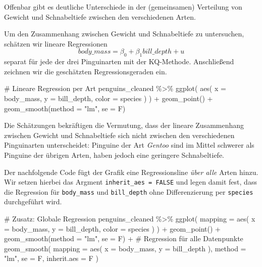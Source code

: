 \documentclass[
  a4paper,
  DIV=11,
  oneside]{scrreprt}
\newenvironment{Shaded}{\begin{snugshade}}{\end{snugshade}}
\newcommand{\NormalTok}[1]{\textcolor[rgb]{0.00,0.23,0.31}{#1}}
\begin{document}
Offenbar gibt es deutliche Unterschiede in der (gemeinsamen) Verteilung
von Gewicht und Schnabeltiefe zwischen den verschiedenen Arten.

Um den Zusammenhang zwischen Gewicht und Schnabeltiefe zu untersuchen,
schätzen wir lineare Regressionen
\[body\_mass = \beta_0 + \beta_1 bill\_depth + u\] separat für jede der
drei Pinguinarten mit der KQ-Methode. Anschließend zeichnen wir die
geschätzten Regressionsgeraden ein.

\begin{Shaded}
\begin{Highlighting}[]
\NormalTok{\# Lineare Regression per Art}
\NormalTok{penguins\_cleaned \%\textgreater{}\%}
\NormalTok{  ggplot(}
\NormalTok{    aes(}
\NormalTok{      x = body\_mass, }
\NormalTok{      y = bill\_depth, }
\NormalTok{      color = species}
\NormalTok{    )}
\NormalTok{  ) +}
\NormalTok{  geom\_point() +}
\NormalTok{  geom\_smooth(method = "lm", se = F)}
\end{Highlighting}
\end{Shaded}

Die Schätzungen bekräftigen die Vermutung, dass der lineare Zusammenhang
zwischen Gewicht und Schnabeltiefe sich nicht zwischen den verschiedenen
Pinguinarten unterscheidet: Pinguine der Art \emph{Gentoo} sind im
Mittel schwerer als Pinguine der übrigen Arten, haben jedoch eine
geringere Schnabeltiefe.

Der nachfolgende Code fügt der Grafik eine Regressionsline \emph{über
alle} Arten hinzu. Wir setzen hierbei das Argment
\texttt{inherit\_aes\ =\ FALSE} und legen damit fest, dass die
Regression für \texttt{body\_mass} und \texttt{bill\_depth} ohne
Differenzierung per \texttt{species} durchgeführt wird.

\begin{Shaded}
\begin{Highlighting}[]
\NormalTok{\# Zusatz: Globale Regression}
\NormalTok{penguins\_cleaned \%\textgreater{}\%}
\NormalTok{  ggplot(}
\NormalTok{    mapping = aes(}
\NormalTok{      x = body\_mass, }
\NormalTok{      y = bill\_depth, }
\NormalTok{      color = species}
\NormalTok{    )}
\NormalTok{  ) +}
\NormalTok{  geom\_point() +}
\NormalTok{  geom\_smooth(method = "lm", se = F) +}
\NormalTok{  \# Regression für alle Datenpunkte}
\NormalTok{  geom\_smooth(}
\NormalTok{    mapping = aes(}
\NormalTok{      x = body\_mass, }
\NormalTok{      y = bill\_depth}
\NormalTok{    ),}
\NormalTok{    method = "lm", }
\NormalTok{    se = F, }
\NormalTok{    inherit.aes = F}
\NormalTok{  )}
\end{Highlighting}
\end{Shaded}
\end{document}
